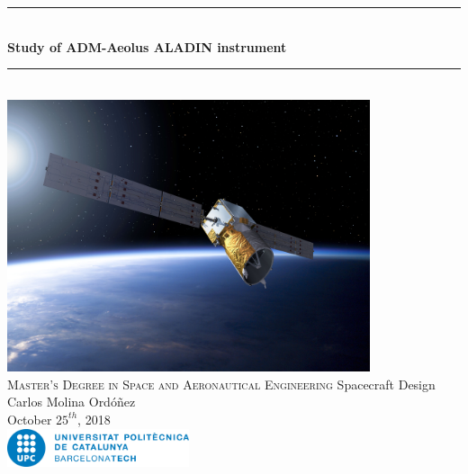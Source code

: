 
\begin{titlepage}

\newcommand{\HRule}{\rule{\linewidth}{0.5mm}} %

\center %


\HRule \\[0.2cm]
{ \Large \bfseries
Study of ADM-Aeolus ALADIN instrument\\
}
\HRule \\[1.5cm]

\includegraphics[width=0.8\textwidth]{img/ADM-Aeolus.jpg}\\[1.4cm]

\textsc{\large Master's Degree in Space and Aeronautical Engineering}
\large Spacecraft Design\\[0.8cm]

{ \normalsize Carlos Molina Ordóñez}\\

{\normalsize October $25^{th}$, 2018}\\[2cm] %

\includegraphics[width=0.4\textwidth]{img/UPC_logo.jpg}\\[0.4cm]


\vfill %

\end{titlepage}
